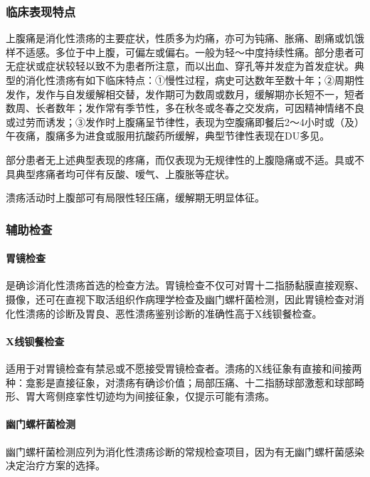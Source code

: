 \subsubsection{临床表现特点}

上腹痛是消化性溃疡的主要症状，性质多为灼痛，亦可为钝痛、胀痛、剧痛或饥饿样不适感。多位于中上腹，可偏左或偏右。一般为轻～中度持续性痛。部分患者可无症状或症状较轻以致不为患者所注意，而以出血、穿孔等并发症为首发症状。典型的消化性溃疡有如下临床特点：①慢性过程，病史可达数年至数十年；②周期性发作，发作与自发缓解相交替，发作期可为数周或数月，缓解期亦长短不一，短者数周、长者数年；发作常有季节性，多在秋冬或冬春之交发病，可因精神情绪不良或过劳而诱发；③发作时上腹痛呈节律性，表现为空腹痛即餐后2～4小时或（及）午夜痛，腹痛多为进食或服用抗酸药所缓解，典型节律性表现在DU多见。

部分患者无上述典型表现的疼痛，而仅表现为无规律性的上腹隐痛或不适。具或不具典型疼痛者均可伴有反酸、嗳气、上腹胀等症状。

溃疡活动时上腹部可有局限性轻压痛，缓解期无明显体征。

\subsubsection{辅助检查}

\paragraph{胃镜检查}

是确诊消化性溃疡首选的检查方法。胃镜检查不仅可对胃十二指肠黏膜直接观察、摄像，还可在直视下取活组织作病理学检查及幽门螺杆菌检测，因此胃镜检查对消化性溃疡的诊断及胃良、恶性溃疡鉴别诊断的准确性高于X线钡餐检查。

\paragraph{X线钡餐检查}

适用于对胃镜检查有禁忌或不愿接受胃镜检查者。溃疡的X线征象有直接和间接两种：龛影是直接征象，对溃疡有确诊价值；局部压痛、十二指肠球部激惹和球部畸形、胃大弯侧痉挛性切迹均为间接征象，仅提示可能有溃疡。

\paragraph{幽门螺杆菌检测}

幽门螺杆菌检测应列为消化性溃疡诊断的常规检查项目，因为有无幽门螺杆菌感染决定治疗方案的选择。

